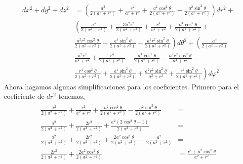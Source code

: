 \begin{equation}
    \begin{aligned}
        d x^2+d y^2+d z^2 & = \left(\frac{a^2}{2\left(a^2+r^2\right)}+\frac{r^2}{a^2+r^2}+\frac{a^2 \cos ^2 \theta}{2\left(a^2+r^2\right)}-\frac{a^2 \sin ^2 \theta}{2\left(a^2+r^2\right)}\right) d r^2+                                                     \\
                          & \left(\frac{a^4}{2\left(a^2+r^2\right)}+\frac{3 a^2 r^2}{2\left(a^2+r^2\right)}+\frac{r^4}{a^2+r^2}+\frac{a^4 \cos ^2 \theta}{2\left(a^2+r^2\right)}+\right.                                                                      \\
                          & \left.\frac{a^2 r^2 \cos ^2 \theta}{2\left(a^2+r^2\right)}-\frac{a^4 \sin ^2 \theta}{2\left(a^2+r^2\right)}-\frac{a^2 r^2 \sin ^2 \theta}{2\left(a^2+r^2\right)}\right) d \theta^2+\left(\frac{a^4}{2\left(a^2+r^2\right)}\right. \\
                          & \frac{a^2 r^2}{a^2+r^2}+\frac{r^4}{2\left(a^2+r^2\right)}-\frac{a^4 \cos ^2 \theta}{2\left(a^2+r^2\right)}-\frac{a^2 r^2 \cos ^2 \theta}{a^2+r^2}-                                                                                \\
                          & \left.\frac{r^4 \cos ^2 \theta}{2\left(a^2+r^2\right)}+\frac{a^4 \sin ^2 \theta}{2\left(a^2+r^2\right)}+\frac{a^2 r^2 \sin ^2 \theta}{a^2+r^2}+\frac{r^4 \sin ^2 \theta}{2\left(a^2+r^2\right)}\right) d \varphi^2
    \end{aligned}
\end{equation}
Ahora hagamos algunas simplificaciones para los coeficientes.
Primero para el coeficiente de $d r^2$ tenemos,
\begin{align}
    \begin{aligned}
        \frac{a^2}{2\left(a^2+r^2\right)}+\frac{r^2}{a^2+r^2}+\frac{a^2 \cos ^2 \theta}{2\left(a^2+r^2\right)}-\frac{a^2 \sin ^2 \theta}{2\left(a^2+r^2\right)}    & =                                        \\
        \frac{a^2}{2\left(a^2+r^2\right)}+\frac{2 r^2}{2\left(a^2+r^2\right)}+\frac{a^2\left(2 \cos ^2 \theta-1\right)}{2\left(a^2+r^2\right)}                     & =                                        \\
        \frac{a^2}{2\left(a^2+r^2\right)}+\frac{2 r^2}{2\left(a^2+r^2\right)}+\frac{2 a^2 \cos ^2 \theta}{2\left(a^2+r^2\right)}-\frac{a^2}{2\left(a^2+r^2\right)} & =                                        \\
        \frac{2 r^2}{2\left(a^2+r^2\right)}+\frac{2 a^2 \cos ^2 \theta}{2\left(a^2+r^2\right)}                                                                     & = \frac{r^2+a^2 \cos ^2 \theta}{a^2+r^2}
    \end{aligned}
\end{align}
